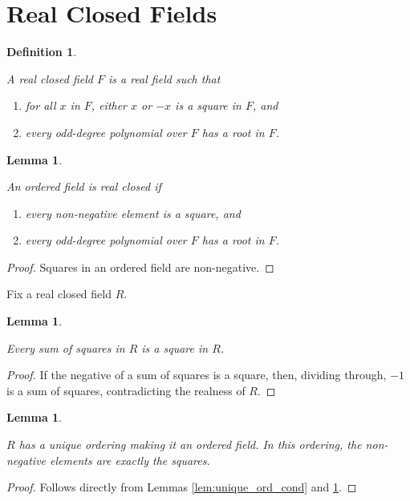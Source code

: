 \documentclass{article}
\newtheorem{lemma}[theorem]{Lemma}
\newtheorem{definition}[theorem]{Definition}
\newcommand{\leanok}{}
\newcommand{\mathlibok}{}
\newcommand{\lean}[1]{}
\newcommand{\uses}[1]{}
\begin{document}
\section{Real Closed Fields}

\begin{definition}
  \label{def:RCF}
  \lean{IsRealClosed}
  \mathlibok
  A real closed field $F$ is a real field such that
  \begin{enumerate}
    \item for all $x$ in $F$, either $x$ or $-x$ is a square in $F$, and
    \item every odd-degree polynomial over $F$ has a root in $F$.
  \end{enumerate}
\end{definition}

\begin{lemma}
  \label{lem:RCF_ord_ax}
  \uses{def:RCF}
  \lean{IsRealClosed.of_linearOrderedField}
  \mathlibok
  An ordered field is real closed if
  \begin{enumerate}
    \item every non-negative element is a square, and
    \item every odd-degree polynomial over $F$ has a root in $F$.
  \end{enumerate}
\end{lemma}
\begin{proof}
  \mathlibok
  Squares in an ordered field are non-negative.
\end{proof}

Fix a real closed field $R$.

\begin{lemma}
  \label{lem:RCF_sumsq_is_sq}
  \uses{def:RCF}
  \lean{IsRealClosed.isSquare_of_isSumSq}
  \leanok
  Every sum of squares in $R$ is a square in $R$.
\end{lemma}
\begin{proof}
  \leanok
  If the negative of a sum of squares is a square, then, dividing through, $-1$ is a sum of squares, contradicting the realness of $R$.
\end{proof}

\begin{lemma}
  \label{lem:RCF_ord_unique}
  \uses{def:RCF}
  \lean{IsSemireal.existsUnique_isStrictOrderedRing_iff, IsRealClosed.nonneg_iff_isSquare}
  \mathlibok
  $R$ has a unique ordering making it an ordered field. In this ordering, the non-negative elements are exactly the squares.
\end{lemma}
\begin{proof}
  \uses{lem:unique_ord_cond,lem:RCF_sumsq_is_sq}
  \mathlibok
  Follows directly from Lemmas \ref{lem:unique_ord_cond} and \ref{lem:RCF_sumsq_is_sq}.
\end{proof}
\end{document}
